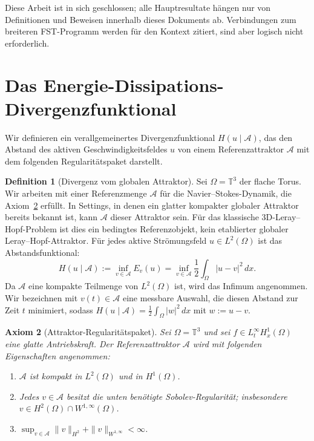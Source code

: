 \documentclass[12pt,a4paper]{article}
\theoremstyle{definition}
\newtheorem{definition}{Definition}[section]
\theoremstyle{plain}
\newtheorem{axiom}[definition]{Axiom}
\theoremstyle{remark}
\begin{document}
Diese Arbeit ist in sich geschlossen; alle Hauptresultate hängen nur von Definitionen und Beweisen innerhalb dieses Dokuments ab. Verbindungen zum breiteren FST-Programm werden für den Kontext zitiert, sind aber logisch nicht erforderlich.

\section{Das Energie-Dissipations-Divergenzfunktional}
Wir definieren ein verallgemeinertes Divergenzfunktional $H(u \mid \mathcal{A})$, das den Abstand des aktiven Geschwindigkeitsfeldes $u$ von einem Referenzattraktor $\mathcal{A}$ mit dem folgenden Regularitätspaket darstellt.

\begin{definition}[Divergenz vom globalen Attraktor]
Sei $\Omega = \mathbb{T}^3$ der flache Torus. Wir arbeiten mit einer Referenzmenge $\mathcal{A}$ für die Navier--Stokes-Dynamik, die Axiom~\ref{prop:attractor-regularity} erfüllt. In Settings, in denen ein glatter kompakter globaler Attraktor bereits bekannt ist, kann $\mathcal{A}$ dieser Attraktor sein. Für das klassische 3D-Leray--Hopf-Problem ist dies ein bedingtes Referenzobjekt, kein etablierter globaler Leray--Hopf-Attraktor. Für jedes aktive Strömungsfeld $u \in L^2(\Omega)$ ist das Abstandsfunktional:
\begin{equation}
    H(u \mid \mathcal{A}) := \inf_{v \in \mathcal{A}} E_{v}(u) = \inf_{v \in \mathcal{A}} \frac{1}{2} \int_\Omega |u - v|^2 \, dx.
\end{equation}
Da $\mathcal{A}$ eine kompakte Teilmenge von $L^2(\Omega)$ ist, wird das Infimum angenommen. Wir bezeichnen mit $v(t) \in \mathcal{A}$ eine messbare Auswahl, die diesen Abstand zur Zeit $t$ minimiert, sodass $H(u \mid \mathcal{A}) = \frac{1}{2} \int_\Omega |w|^2 \, dx$ mit $w := u - v$.
\end{definition}

\begin{axiom}[Attraktor-Regularitätspaket]
\label{prop:attractor-regularity}
Sei $\Omega = \mathbb{T}^3$ und sei $f \in L^\infty_t H^1_x(\Omega)$ eine glatte
Antriebskraft. Der Referenzattraktor $\mathcal{A}$ wird mit folgenden Eigenschaften angenommen:
\begin{enumerate}
    \item[\emph{(i)}]   $\mathcal{A}$ ist kompakt in $L^2(\Omega)$ und in $H^1(\Omega)$.
    \item[\emph{(ii)}]  Jedes $v \in \mathcal{A}$ besitzt die unten benötigte Sobolev-Regularität; insbesondere $v \in H^2(\Omega) \cap W^{1,\infty}(\Omega)$.
    \item[\emph{(iii)}] $\sup_{v \in \mathcal{A}} \|v\|_{H^2} + \|v\|_{W^{1,\infty}} < \infty$.
\end{enumerate}
\end{axiom}
\end{document}
